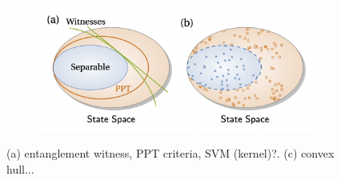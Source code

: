 \documentclass[
aps,
pra,
linenumbers,
floatfix,
]{revtex4-2}
\theoremstyle{plain}
\theoremstyle{definition}
\begin{document}
\begin{figure}[!ht]
\begin{subfigure}{0.3\textwidth}
	\end{subfigure}
	\begin{subfigure}{0.3\textwidth}
		\centering
		\includegraphics[width=.9\linewidth]{ppt.png}
	\end{subfigure}
	\caption{(a) entanglement witness, PPT criteria, SVM (kernel)?. (c) convex hull... }
	\label{fig:entangle}
\end{figure}
\end{document}
